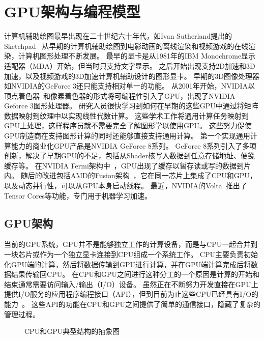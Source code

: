 \section{GPU架构与编程模型}
\label{sec:gpu}
计算机辅助绘图最早出现在二十世纪六十年代，如Ivan Sutherland提出的Sketchpad~
从早期的计算机辅助绘图到电影动画的离线渲染和视频游戏的在线渲染，计算机图形处理不断发展。
最早的显卡是从1981年的IBM Monochrome显示适配器（MDA）开始，但当时只支持文字显示。
之后开始出现支持2D加速和3D加速，以及视频游戏的3D加速计算机辅助设计的图形显卡。
早期的3D图像处理器如NVIDIA的GeForce 3还只能支持相对单一的功能。
从2001年开始，NVIDIA以顶点着色器~和像素着色器的形式将可编程性引入了GPU，出现了NVIDIA Geforce 3图形处理器。
研究人员很快学习到如何在早期的这些GPU中通过将矩阵数据映射到纹理中以实现线性代数计算。
这些学术工作将通用计算任务映射到GPU上处理，这样程序员就不需要完全了解图形学以使用GPU。
这些努力促使GPU制造商在支持图形计算的同时还能够直接支持通用计算。
第一个实现通用计算能力的商业化GPU产品是NVIDIA GeForce 8系列。 
GeForce 8系列引入了多项创新，解决了早期GPU的不足，包括从Shader核写入数据到任意存储地址、便笺缓存等。
在NVIDIA Fermi架构中~，GPU出现了缓存以暂存读或写的数据到片内。
随后的改进包括AMD的Fusion架构~，它在同一芯片上集成了CPU和GPU，以及动态并行性，可以从GPU本身启动线程。
最近，NVIDIA的Volta~推出了Tensor Cores等功能，专门用于机器学习加速。

\subsection{GPU架构}
当前的GPU系统，GPU并不是能够独立工作的计算设备，而是与CPU一起合并到一块芯片或作为一个独立显卡连接到CPU组成一个系统工作。
CPU主要负责初始化GPU端的计算，然后将数据传输到GPU进行计算，并在GPU端计算完成后将数据结果传输回CPU。
在CPU和GPU之间进行这种分工的一个原因是计算的开始和结束通常需要访问输入/输出（I/O）设备。 
虽然正在不断努力开发直接在GPU上提供I/O服务的应用程序编程接口（API），但到目前为止这些CPU已经具有I/O的能力~。
这些API的功能在CPU和GPU之间提供了简单的通信接口，隐藏了复杂的管理过程。


\begin{figure}[htb]
\centering
{} \qquad
{} 
\caption{CPU和GPU典型结构的抽象图}
\label{fig:CPUGPU}
\end{figure}

